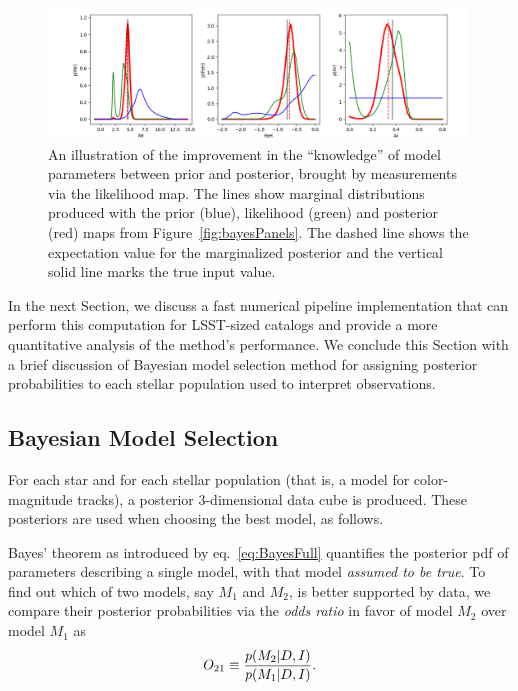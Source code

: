 \begin{figure}[t!]
\includegraphics[width=0.99\textwidth,angle=0]{figures/margPosteriors3D_ex1.png}
\caption{An illustration of the improvement in the ``knowledge'' of model parameters between prior and posterior,
brought by measurements via the likelihood map. The lines show marginal distributions produced with the
prior (blue), likelihood (green) and posterior (red) maps from Figure~\ref{fig:bayesPanels}. The dashed line shows the
expectation value for the marginalized posterior and the vertical solid line marks the true input value.}
\label{fig:margPost3D}
\end{figure}



In the next Section, we discuss a fast numerical pipeline implementation that can perform this computation for LSST-sized
catalogs and provide a more quantitative analysis of the method's performance.  We conclude this Section with a brief
discussion of Bayesian model selection method for assigning posterior probabilities to each stellar population used to interpret
observations. 


\subsection{Bayesian Model Selection \label{sec:ModSel}} 

For each star and for each stellar population (that is, a model for color-magnitude tracks), a posterior
3-dimensional data cube is produced.  These posteriors are used when choosing the best model, as follows.

Bayes' theorem as introduced by eq.~\ref{eq:BayesFull} quantifies the posterior
pdf of parameters describing a single model, with that model {\it assumed to be true}.
To find out which of two models, say $M_1$ and $M_2$, is better supported by data, we
compare their posterior probabilities via the {\it odds ratio} in favor of model $M_2$ over
model $M_1$ as 
\begin{equation}
                  O_{21} \equiv { p(M_2|D,I) \over p(M_1|D,I) }.
\end{equation}     

